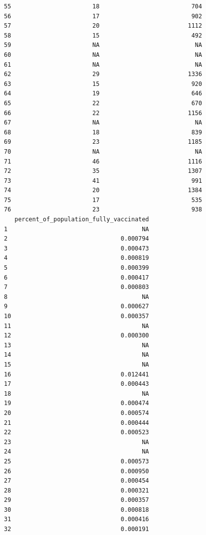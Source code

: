 \documentclass[
  letterpaper,
  DIV=11,
  numbers=noendperiod]{scrartcl}
\begin{document}
\begin{verbatim}
55                       18                          704
56                       17                          902
57                       20                         1112
58                       15                          492
59                       NA                           NA
60                       NA                           NA
61                       NA                           NA
62                       29                         1336
63                       15                          920
64                       19                          646
65                       22                          670
66                       22                         1156
67                       NA                           NA
68                       18                          839
69                       23                         1185
70                       NA                           NA
71                       46                         1116
72                       35                         1307
73                       41                          991
74                       20                         1384
75                       17                          535
76                       23                          938
   percent_of_population_fully_vaccinated
1                                      NA
2                                0.000794
3                                0.000473
4                                0.000819
5                                0.000399
6                                0.000417
7                                0.000803
8                                      NA
9                                0.000627
10                               0.000357
11                                     NA
12                               0.000300
13                                     NA
14                                     NA
15                                     NA
16                               0.012441
17                               0.000443
18                                     NA
19                               0.000474
20                               0.000574
21                               0.000444
22                               0.000523
23                                     NA
24                                     NA
25                               0.000573
26                               0.000950
27                               0.000454
28                               0.000321
29                               0.000357
30                               0.000818
31                               0.000416
32                               0.000191

\end{verbatim}
\end{document}
